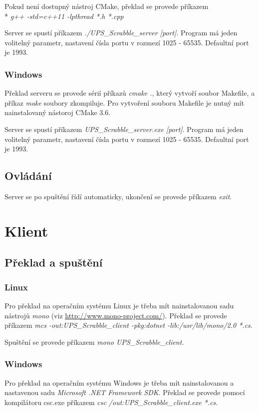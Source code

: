 Pokud není dostupný nástroj CMake, překlad se provede příkazem \\* \emph{g++ -std=c++11 -lpthread *.h *.cpp}

Server se spustí příkazem \emph{./UPS\_Scrabble\_server [port]}. Program má jeden volitelný parametr, nastavení čísla portu v rozmezí 1025 - 65535. Defaultní port je 1993.

\subsubsection{Windows}
Překlad serveru se provede sérií příkazů \emph{cmake .}, který vytvoří soubor Makefile, a příkaz \emph{make} soubory zkompiluje. Pro vytvoření souboru Makefile je nutný mít nainstalovaný nástoroj CMake 3.6.

Server se spustí příkazem \emph{UPS\_Scrabble\_server.exe [port]}. Program má jeden volitelný parametr, nastavení čísla portu v rozmezí 1025 - 65535. Defaultní port je 1993.

\subsection{Ovládání}
Server se po spuštění řídí automaticky, ukončení se provede příkazem \emph{exit}.


\section{Klient}
\subsection{Překlad a spuštění}
\subsubsection{Linux}
Pro překlad na operačním systému Linux je třeba mít nainstalovanou sadu nástrojů \emph{mono} (viz \url{http://www.mono-project.com/}).
Překlad se provede příkazem \emph{mcs -out:UPS\_Scrabble\_client -pkg:dotnet -lib:/usr/lib/mono/2.0 *.cs}.

Spuštění se provede příkazem \emph{mono UPS\_Scrabble\_client}.

\subsubsection{Windows}
Pro překlad na operačním systému Windows je třeba mít nainstalovanou a nastavenou sadu \emph{Microsoft .NET Framework SDK}.
Překlad se provede pomocí kompilátoru csc.exe příkazem \emph{csc /out:UPS\_Scrabble\_client.exe *.cs}.

